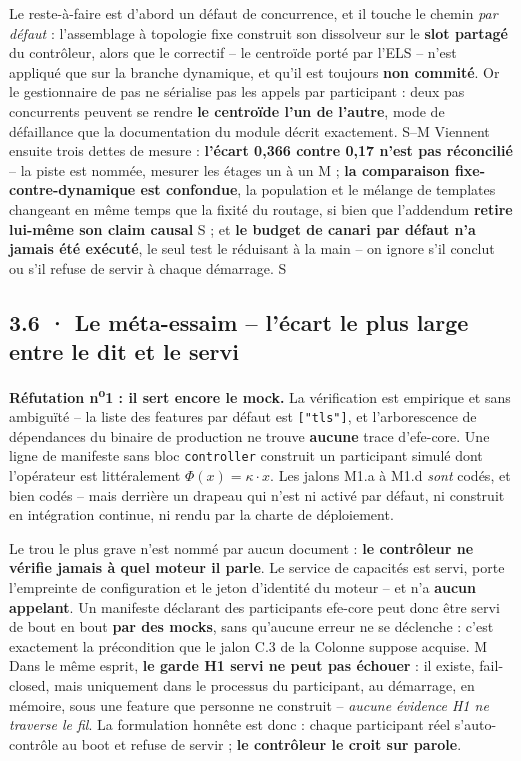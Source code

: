\documentclass[10pt]{article}
\newcommand{\sz}[1]{{\small\color{grey}\textsf{#1}}}
\newcommand{\code}[1]{\texttt{\small #1}}
\begin{document}
Le reste-à-faire est d'abord un défaut de concurrence, et il touche le chemin \emph{par défaut} :
l'assemblage à topologie fixe construit son dissolveur sur le \textbf{slot partagé} du contrôleur, alors
que le correctif -- le centroïde porté par l'ELS -- n'est appliqué que sur la branche dynamique, et
qu'il est toujours \textbf{non commité}. Or le gestionnaire de pas ne sérialise pas les appels par
participant : deux pas concurrents peuvent se rendre \textbf{le centroïde l'un de l'autre}, mode de
défaillance que la documentation du module décrit exactement. \sz{S--M} Viennent ensuite trois dettes de
mesure : \textbf{l'écart 0,366 contre 0,17 n'est pas réconcilié} -- la piste est nommée, mesurer les
étages un à un \sz{M} ; \textbf{la comparaison fixe-contre-dynamique est confondue}, la population et le
mélange de templates changeant en même temps que la fixité du routage, si bien que l'addendum
\textbf{retire lui-même son claim causal} \sz{S} ; et \textbf{le budget de canari par défaut n'a jamais
été exécuté}, le seul test le réduisant à la main -- on ignore s'il conclut ou s'il refuse de servir à
chaque démarrage. \sz{S}

\subsection{3.6 · Le méta-essaim -- l'écart le plus large entre le dit et le servi}

\textbf{Réfutation n\textsuperscript{o}1 : il sert encore le mock.} La vérification est empirique et
sans ambiguïté -- la liste des features par défaut est \code{["tls"]}, et l'arborescence de dépendances
du binaire de production ne trouve \textbf{aucune} trace d'efe-core. Une ligne de manifeste sans bloc
\code{controller} construit un participant simulé dont l'opérateur est littéralement
$\Phi(x) = \kappa \cdot x$. Les jalons M1.a à M1.d \emph{sont} codés, et bien codés -- mais derrière un
drapeau qui n'est ni activé par défaut, ni construit en intégration continue, ni rendu par la charte de
déploiement.

Le trou le plus grave n'est nommé par aucun document : \textbf{le contrôleur ne vérifie jamais à quel
moteur il parle}. Le service de capacités est servi, porte l'empreinte de configuration et le jeton
d'identité du moteur -- et n'a \textbf{aucun appelant}. Un manifeste déclarant des participants efe-core
peut donc être servi de bout en bout \textbf{par des mocks}, sans qu'aucune erreur ne se déclenche :
c'est exactement la précondition que le jalon C.3 de la Colonne suppose acquise. \sz{M} Dans le même
esprit, \textbf{le garde H1 servi ne peut pas échouer} : il existe, fail-closed, mais uniquement dans le
processus du participant, au démarrage, en mémoire, sous une feature que personne ne construit --
\emph{aucune évidence H1 ne traverse le fil}. La formulation honnête est donc : chaque participant réel
s'auto-contrôle au boot et refuse de servir ; \textbf{le contrôleur le croit sur parole}.
\end{document}
